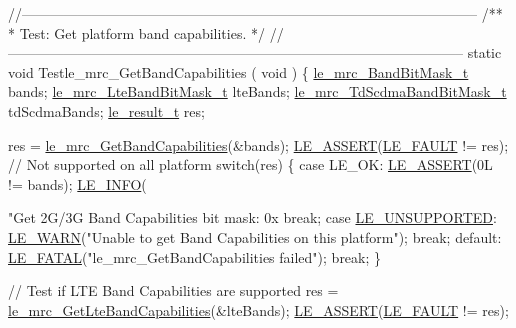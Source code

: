 \begin{DoxyCodeInclude}
\textcolor{comment}{//--------------------------------------------------------------------------------------------------}\textcolor{comment}{}
\textcolor{comment}{/**}
\textcolor{comment}{ * Test: Get platform band capabilities.}
\textcolor{comment}{ */}
\textcolor{comment}{//--------------------------------------------------------------------------------------------------}
\textcolor{keyword}{static} \textcolor{keywordtype}{void} Testle\_mrc\_GetBandCapabilities
(
    \textcolor{keywordtype}{void}
)
\{
    \hyperlink{le__mrc__interface_8h_a048374324f72ee7df52c2e0521c0dda3}{le\_mrc\_BandBitMask\_t}        bands;
    \hyperlink{le__mrc__interface_8h_a81d705d61ee7ee56eab6aafb1af92579}{le\_mrc\_LteBandBitMask\_t}     lteBands;
    \hyperlink{le__mrc__interface_8h_a418a508a9a6dbd3a4a68458f0c64a00e}{le\_mrc\_TdScdmaBandBitMask\_t} tdScdmaBands;
    \hyperlink{le__basics_8h_a1cca095ed6ebab24b57a636382a6c86c}{le\_result\_t}                 res;

    res = \hyperlink{le__mrc__interface_8h_a7cb0a206729c652692701cd24226d34f}{le\_mrc\_GetBandCapabilities}(&bands);
    \hyperlink{le__log_8h_ac0dbbef91dc0fed449d0092ff0557b39}{LE\_ASSERT}(\hyperlink{le__basics_8h_a1cca095ed6ebab24b57a636382a6c86cac409634423b6b1ef09643529f6224798}{LE\_FAULT} != res);
    \textcolor{comment}{// Not supported on all platform}
    \textcolor{keywordflow}{switch}(res)
    \{
        \textcolor{keywordflow}{case} LE\_OK:
            \hyperlink{le__log_8h_ac0dbbef91dc0fed449d0092ff0557b39}{LE\_ASSERT}(0L != bands);
            \hyperlink{le__log_8h_a23e6d206faa64f612045d688cdde5808}{LE\_INFO}(\textcolor{stringliteral}{"Get 2G/3G Band Capabilities bit mask: 0x%
            \textcolor{keywordflow}{break};
        \textcolor{keywordflow}{case} \hyperlink{le__basics_8h_a1cca095ed6ebab24b57a636382a6c86ca5377262702e8434207b03533259e0c5f}{LE\_UNSUPPORTED}:
            \hyperlink{le__log_8h_a0201b2f60ee0e945479f91e181bf04b6}{LE\_WARN}(\textcolor{stringliteral}{"Unable to get Band Capabilities on this platform"});
            \textcolor{keywordflow}{break};
        \textcolor{keywordflow}{default}:
            \hyperlink{le__log_8h_a54b4b07f5396e19a8d9fca74238f4795}{LE\_FATAL}(\textcolor{stringliteral}{"le\_mrc\_GetBandCapabilities failed"});
            \textcolor{keywordflow}{break};
    \}

    \textcolor{comment}{// Test if LTE Band Capabilities are supported}
    res = \hyperlink{le__mrc__interface_8h_ad6b44639b1d9755b92720d5184ee2515}{le\_mrc\_GetLteBandCapabilities}(&lteBands);
    \hyperlink{le__log_8h_ac0dbbef91dc0fed449d0092ff0557b39}{LE\_ASSERT}(\hyperlink{le__basics_8h_a1cca095ed6ebab24b57a636382a6c86cac409634423b6b1ef09643529f6224798}{LE\_FAULT} != res);

}
\end{DoxyCodeInclude}
